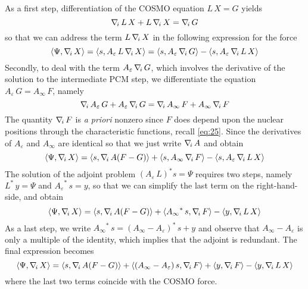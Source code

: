 As a first step, differentiation of the COSMO equation $L\, X = G$ yields
\[
\nabla_{\!i}\, L \, X + L \, \nabla_{\!i}\, X = \nabla_{\!i}\, G
\]
so that we can address the term $L \, \nabla_{\!i}\, X$ in the following expression for the force
\[
\langle \Psi , \nabla_{\!i}\, X\rangle  = \langle s ,  A_\varepsilon \, L \, \nabla_{\!i}\, X\rangle
 = \langle s ,  A_\varepsilon \, \nabla_{\!i}\, G \rangle - \langle s , A_\varepsilon \, \nabla_{\!i}\, L \,  X \rangle
\]
Secondly, to deal with the term $A_\varepsilon \, \nabla_{\!i}\, G$, which involves the derivative of the solution to the intermediate PCM step, we differentiate the equation $A_\varepsilon \, G = A_\infty \, F$, namely
\[
\nabla_{\!i}\, A_\varepsilon \, G + A_\varepsilon \, \nabla_{\!i}\, G = \nabla_{\!i}\, A_\infty \, F + A_\infty \, \nabla_{\!i}\, F
\]
The quantity $\nabla_{\!i}\, F$ is \emph{a priori} nonzero since $F$ does depend upon the nuclear positions through the characteristic functions, recall \eqref{eq:25}. Since the derivatives of $A_\varepsilon$ and $A_\infty$ are identical so that we just write $\nabla_{\!i}\, A$ and obtain
\[
\langle \Psi , \nabla_{\!i}\, X\rangle = \langle s , \nabla_{\!i}\,  A ( F - G ) \rangle + \langle  s ,{A_\infty}\, \nabla_{\!i}\, F \rangle - \langle  s , {A_\varepsilon}\, \nabla_{\!i}\, L \,  X \rangle
\]
The solution of the adjoint problem $(A_\varepsilon \, L )^* s = \Psi$ requires two steps, namely ${L}^* \, y = \Psi$ and ${A_\varepsilon}^* \, s = y$, so that we can simplify the last term on the right-hand-side, and obtain
\[
\langle \Psi , \nabla_{\!i}\, X\rangle = \langle s , \nabla_{\!i}\,  A ( F - G ) \rangle + \langle {A_\infty}^*\, s , \nabla_{\!i}\, F \rangle - \langle  y , \nabla_{\!i}\, L \,  X \rangle
\]
As a last step, we write ${A_\infty}^*\, s = ({A_\infty}-{A_\varepsilon})^*\, s + y$ and observe that ${A_\infty}-{A_\varepsilon} $ is only a multiple of the identity, which implies that the adjoint is redundant. The final expression becomes
\[
\langle \Psi , \nabla_{\!i}\, X\rangle = \langle s , \nabla_{\!i}\,  A ( F - G ) \rangle + \langle ({A_\infty}-{A_\varepsilon})\, s, \nabla_{\!i}\, F \rangle +\langle y , \nabla_{\!i}\, F \rangle - \langle  y , \nabla_{\!i}\, L \,  X \rangle
\]
where the last two terms coincide with the COSMO force.

